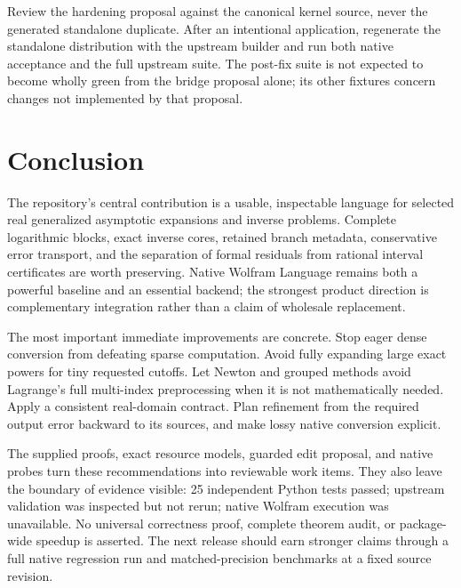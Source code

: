 \documentclass[11pt,a4paper]{article}
\begin{document}
Review the hardening proposal against the canonical kernel source, never the generated standalone duplicate. After an intentional application, regenerate the standalone distribution with the upstream builder and run both native acceptance and the full upstream suite. The post-fix suite is not expected to become wholly green from the bridge proposal alone; its other fixtures concern changes not implemented by that proposal.

\section{Conclusion}

The repository's central contribution is a usable, inspectable language for selected real generalized asymptotic expansions and inverse problems. Complete logarithmic blocks, exact inverse cores, retained branch metadata, conservative error transport, and the separation of formal residuals from rational interval certificates are worth preserving. Native Wolfram Language remains both a powerful baseline and an essential backend; the strongest product direction is complementary integration rather than a claim of wholesale replacement.

The most important immediate improvements are concrete. Stop eager dense conversion from defeating sparse computation. Avoid fully expanding large exact powers for tiny requested cutoffs. Let Newton and grouped methods avoid Lagrange's full multi-index preprocessing when it is not mathematically needed. Apply a consistent real-domain contract. Plan refinement from the required output error backward to its sources, and make lossy native conversion explicit.

The supplied proofs, exact resource models, guarded edit proposal, and native probes turn these recommendations into reviewable work items. They also leave the boundary of evidence visible: 25 independent Python tests passed; upstream validation was inspected but not rerun; native Wolfram execution was unavailable. No universal correctness proof, complete theorem audit, or package-wide speedup is asserted. The next release should earn stronger claims through a full native regression run and matched-precision benchmarks at a fixed source revision.

\clearpage

\end{document}
